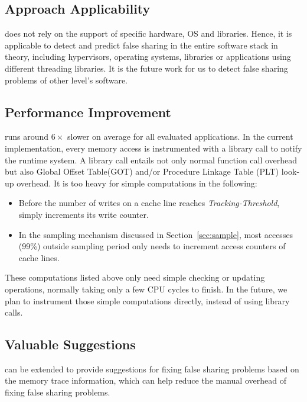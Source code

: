 \label{sec:futurework}

\subsection{Approach Applicability}
\Predator{} does not rely on the support of specific hardware, OS and libraries.
Hence, it is applicable to detect and predict false sharing in the entire software stack in theory, including hypervisors, operating systems, libraries or applications using different threading libraries. It is the future work for us to detect false sharing problems of other level's software.


\subsection{Performance Improvement}
\Predator{} runs around $6\times$ slower on average for all evaluated applications. In the current implementation, every memory access is instrumented with a library call to notify the runtime system. A library call entails not only normal function call overhead but also Global Offset Table(GOT) and/or Procedure Linkage Table (PLT) look-up overhead. 
It is too heavy for simple computations in the following:

\begin{itemize}
\item
Before the number of writes on a cache line reaches {\it Tracking-Threshold},  \Predator{} simply increments its write counter.

\item
In the sampling mechanism discussed in Section~\ref{sec:sample}, most accesses (99\%) outside sampling period only needs to increment access counters of cache lines.
\end{itemize}

These computations listed above only need simple checking or updating operations, normally taking only a few CPU cycles to finish. 
In the future, we plan to instrument those simple computations directly, instead of using library calls.

\subsection{Valuable Suggestions}
\Predator{} can be extended to provide suggestions for fixing false sharing problems based on the memory trace information, which can help reduce the manual overhead of fixing false sharing problems.  
